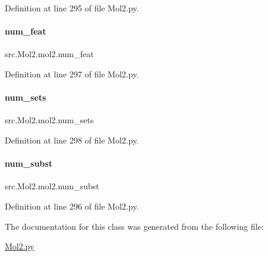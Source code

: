 Definition at line 295 of file Mol2.\+py.

\mbox{\label{classsrc_1_1Mol2_1_1mol2_a19373b7e59f74f0e860812f7955c9784}} 
\paragraph{\texorpdfstring{num\+\_\+feat}{num\_feat}}
{\footnotesize\ttfamily src.\+Mol2.\+mol2.\+num\+\_\+feat}



Definition at line 297 of file Mol2.\+py.

\mbox{\label{classsrc_1_1Mol2_1_1mol2_a9c7d152a22bdb35dba0663ab3ad7b647}} 
\paragraph{\texorpdfstring{num\+\_\+sets}{num\_sets}}
{\footnotesize\ttfamily src.\+Mol2.\+mol2.\+num\+\_\+sets}



Definition at line 298 of file Mol2.\+py.

\mbox{\label{classsrc_1_1Mol2_1_1mol2_acb2006979cf623c41bb9bc71231a8146}} 
\paragraph{\texorpdfstring{num\+\_\+subst}{num\_subst}}
{\footnotesize\ttfamily src.\+Mol2.\+mol2.\+num\+\_\+subst}



Definition at line 296 of file Mol2.\+py.



The documentation for this class was generated from the following file\+:\begin{DoxyCompactItemize}
\item 
\hyperlink{Mol2_8py}{Mol2.\+py}\end{DoxyCompactItemize}
